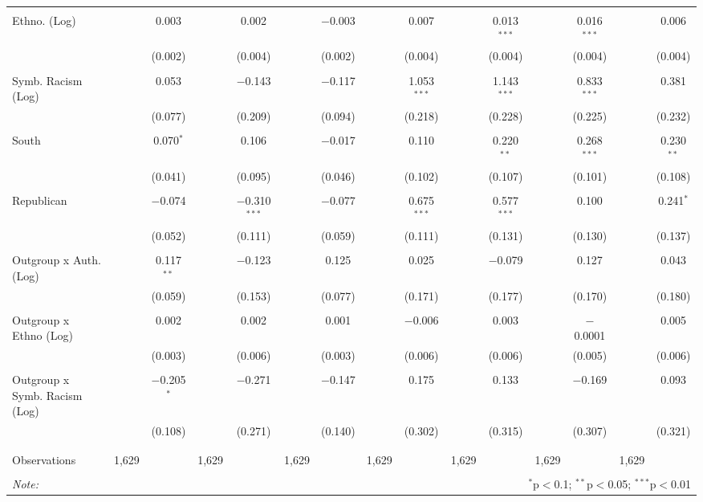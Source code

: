 \begin{table}[H]
{\begin{tabular}{@{\extracolsep{5pt}}lcccccccccccccc}
  & & & & & & & & & & & & & & \\ 
 Ethno. (Log) &  & 0.003 &  & 0.002 &  & $-$0.003 &  & 0.007 &  & 0.013$^{***}$ &  & 0.016$^{***}$ &  & 0.006 \\ 
  &  & (0.002) &  & (0.004) &  & (0.002) &  & (0.004) &  & (0.004) &  & (0.004) &  & (0.004) \\ 
  & & & & & & & & & & & & & & \\ 
 Symb. Racism (Log) &  & 0.053 &  & $-$0.143 &  & $-$0.117 &  & 1.053$^{***}$ &  & 1.143$^{***}$ &  & 0.833$^{***}$ &  & 0.381 \\ 
  &  & (0.077) &  & (0.209) &  & (0.094) &  & (0.218) &  & (0.228) &  & (0.225) &  & (0.232) \\ 
  & & & & & & & & & & & & & & \\ 
 South &  & 0.070$^{*}$ &  & 0.106 &  & $-$0.017 &  & 0.110 &  & 0.220$^{**}$ &  & 0.268$^{***}$ &  & 0.230$^{**}$ \\ 
  &  & (0.041) &  & (0.095) &  & (0.046) &  & (0.102) &  & (0.107) &  & (0.101) &  & (0.108) \\ 
  & & & & & & & & & & & & & & \\ 
 Republican &  & $-$0.074 &  & $-$0.310$^{***}$ &  & $-$0.077 &  & 0.675$^{***}$ &  & 0.577$^{***}$ &  & 0.100 &  & 0.241$^{*}$ \\ 
  &  & (0.052) &  & (0.111) &  & (0.059) &  & (0.111) &  & (0.131) &  & (0.130) &  & (0.137) \\ 
  & & & & & & & & & & & & & & \\ 
 Outgroup x Auth. (Log) &  & 0.117$^{**}$ &  & $-$0.123 &  & 0.125 &  & 0.025 &  & $-$0.079 &  & 0.127 &  & 0.043 \\ 
  &  & (0.059) &  & (0.153) &  & (0.077) &  & (0.171) &  & (0.177) &  & (0.170) &  & (0.180) \\ 
  & & & & & & & & & & & & & & \\ 
 Outgroup x Ethno (Log) &  & 0.002 &  & 0.002 &  & 0.001 &  & $-$0.006 &  & 0.003 &  & $-$0.0001 &  & 0.005 \\ 
  &  & (0.003) &  & (0.006) &  & (0.003) &  & (0.006) &  & (0.006) &  & (0.005) &  & (0.006) \\ 
  & & & & & & & & & & & & & & \\ 
 Outgroup x Symb. Racism (Log) &  & $-$0.205$^{*}$ &  & $-$0.271 &  & $-$0.147 &  & 0.175 &  & 0.133 &  & $-$0.169 &  & 0.093 \\ 
  &  & (0.108) &  & (0.271) &  & (0.140) &  & (0.302) &  & (0.315) &  & (0.307) &  & (0.321) \\ 
  & & & & & & & & & & & & & & \\ 
\hline \\[-1.8ex] 
Observations & 1,629 &  & 1,629 &  & 1,629 &  & 1,629 &  & 1,629 &  & 1,629 &  & 1,629 &  \\ 
\hline 
\hline \\[-1.8ex] 
\textit{Note:}  & \multicolumn{14}{r}{$^{*}$p$<$0.1; $^{**}$p$<$0.05; $^{***}$p$<$0.01} \\ 
\end{tabular}} 
\end{table} 
